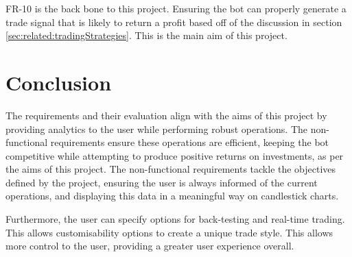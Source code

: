 FR-10 is the back bone to this project. Ensuring the bot can properly generate a trade signal that is likely to return a profit based off of the discussion in section \ref{sec:related:tradingStrategies}. This is the main aim of this project.


\section{Conclusion}
\label{sec:requirements:conclusion}
The requirements and their evaluation align with the aims of this project by providing analytics to the user while performing robust operations. The non-functional requirements ensure these operations are efficient, keeping the bot competitive while attempting to produce positive returns on investments, as per the aims of this project. The non-functional requirements tackle the objectives defined by the project, ensuring the user is always informed of the current operations, and displaying this data in a meaningful way on candlestick charts. 

Furthermore, the user can specify options for back-testing and real-time trading. This allows customisability options to create a unique trade style. This allows more control to the user, providing a greater user experience overall.


